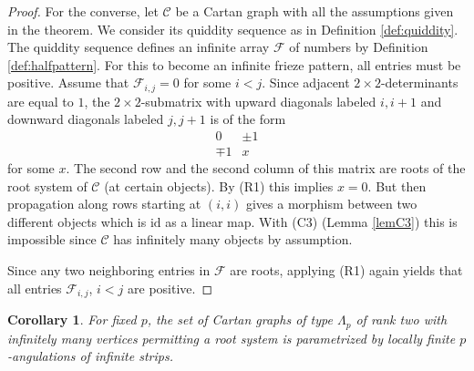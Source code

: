 \documentclass[11pt,a4paper]{amsart}
\newtheorem{Corollary}[Lemma]{Corollary}
\theoremstyle{definition}
\numberwithin{equation}{section}
\newcommand{\id }{\mathrm{id}}
\newcommand{\Cc }{\mathcal{C}}
\begin{document}
\begin{proof}
{For the converse, let $\Cc$ be a Cartan graph with all the assumptions given in the theorem.
We consider its quiddity sequence 
as in Definition \ref{def:quiddity}. 
The quiddity sequence defines an infinite 
array $\mathcal{F}$ of numbers by Definition 
\ref{def:halfpattern}. For this to become
an infinite frieze pattern, all entries
must be positive. 
Assume that $\mathcal{F}_{i,j}=0$ for some $i<j$. Since adjacent $2\times 2$-determinants are equal to $1$, the $2\times 2$-submatrix with upward diagonals labeled $i,i+1$ and 
downward diagonals labeled $j,j+1$ 
is of the form
$$
\begin{matrix}
0 & \pm 1 \\
\mp 1 & x
\end{matrix}
$$
for some $x$. The second row and the second column of this matrix are roots of the root system of $\Cc$ (at certain objects). By (R1) this implies $x=0$.
But then propagation along rows starting at $(i,i)$ gives a morphism between two different objects which is $\id$ as a linear map. 
With (C3) (Lemma \ref{lemC3}) this is impossible since $\Cc$ has infinitely many objects by assumption.

Since any two neighboring entries in $\mathcal{F}$ are roots, applying (R1) again yields that all entries $\mathcal{F}_{i,j}$, $i<j$ are positive.
}
\end{proof}

\begin{Corollary}
For fixed $p$, the set of Cartan graphs of type $\Lambda_p$ of rank two with infinitely many 
vertices permitting a root system is parametrized by locally finite $p$-angulations of infinite strips.
\end{Corollary}
\end{document}
